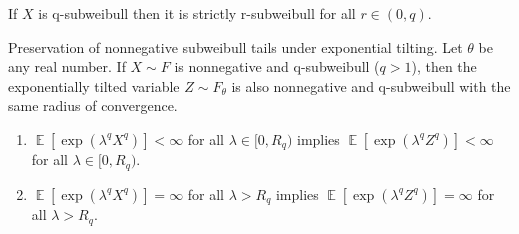 \documentclass[10pt,a4paper]{amsart}
\DeclareMathOperator{\E}{\mathbb{E}}
\begin{document}
\begin{corollary}
\label{cor:strict-subweib}
If $X$ is q-subweibull then it is strictly r-subweibull for all $r\in (0,q)$. 
\end{corollary}

\begin{lemma}
\label{lem:exp-tilt-nonneg}
Preservation of nonnegative subweibull tails under exponential tilting. Let $\theta$ be any real number.
If $X\sim F$ is nonnegative and q-subweibull ($q>1$), then the exponentially tilted variable $Z\sim F_\theta$ is also nonnegative and q-subweibull with the same radius of convergence.
\begin{enumerate}%
  \item $\E[\exp(\lambda^q X^q)]<\infty$ for all $\lambda\in [0,R_q)$ implies $\E[\exp(\lambda^q Z^q)]<\infty$ for all $\lambda\in [0,R_q)$.
  \item $\E[\exp(\lambda^q X^q)]=\infty$ for all $\lambda>R_q$ implies $\E[\exp(\lambda^q Z^q)]=\infty$ for all $\lambda>R_q$. 
\end{enumerate}
\end{lemma}
\end{document}
